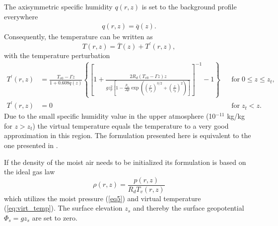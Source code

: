 \documentclass[times,doublespace]{fldauth}
\begin{document}
The axisymmetric specific humidity $q(r,z)$ is set to the background profile everywhere
\begin{eqnarray}
\label{eq:q}
q(r,z) = \overline{q}(z).
\end{eqnarray}  Consequently, the temperature can be written as
\begin{equation} \label{test5:T_eqn}
T(r,z) = \overline{T}(z) + T^\prime(r,z),
\end{equation} with the temperature perturbation
\begin{align} \label{eq:temperature}
T^\prime(r,z) &= \frac{T_{v0} - \Gamma z}{1+0.608\overline{q}(z)} \left\{ \left [1+ \frac{2R_d(T_{v0} - \Gamma z)z}{gz_p^2 \left[ 1 - \frac{p_b}{\Delta p}\exp\left({\left (\frac{r}{r_p} \right ) ^{3/2}} + {\left (\frac{z}{z_p} \right ) ^{2}} \right) \right] }\right]^{-1} - 1 \right\} & & \mbox{for} \; 0 \le z \le z_t, \nonumber \\
T^\prime(r,z) &= 0 & & \mbox{for} \; z_t < z. 
\end{align}  
Due to the small specific humidity value in the upper atmosphere (10$^{-11}$ kg/kg for $z > z_t$) the virtual temperature equals the temperature to a very good approximation in this region. The formulation presented here is equivalent to the one presented in \cite{reed2012idealized}.

If the density of the moist air needs to be initialized its formulation is based on the ideal gas law
\begin{equation} \label{eq:density}
\rho(r,z) = \frac{p(r,z)}{R_d T_v(r,z)}
\end{equation} 
which utilizes the moist pressure (\ref{eq5}) and virtual temperature (\ref{eq:virt_temp}). The surface elevation $z_s$ and thereby the surface geopotential $\Phi_s=g z_s$ are set to zero.
 
\end{document}

